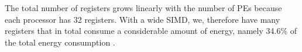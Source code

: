 The total number of registers grows linearly with the number of PEs because each processor has 32 registers. With a wide SIMD, we, therefore have many registers that in total consume a considerable amount of energy, namely 34.6\% of the total energy consumption \cite{dongrio1}.









